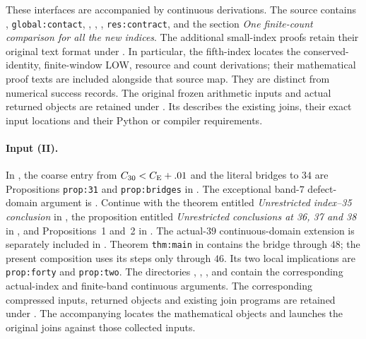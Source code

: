 These interfaces are accompanied by continuous derivations.
The source
contains , \texttt{global:contact},
,
,
, \texttt{res:contract},
and the section \emph{One finite-count comparison for all the new indices}.
The additional small-index proofs retain their original text format under
.
In particular, the fifth-index
locates the conserved-identity, finite-window LOW, resource and count
derivations; their mathematical proof texts are included alongside that
source map. They are distinct from numerical success records.
The original frozen arithmetic inputs and actual returned objects are
retained under .
Its  describes the existing joins,
their exact input locations and their Python or compiler requirements.

\paragraph{Input (II).}
In , the coarse entry from
$C_{30}<C_{\mathrm E}+.01$ and the literal bridges to $34$ are
Propositions \texttt{prop:31} and \texttt{prop:bridges} in
. The exceptional band-$7$ defect-domain
argument is .
Continue with the theorem entitled
\emph{Unrestricted index--35 conclusion} in
,
the proposition entitled \emph{Unrestricted conclusions at 36, 37 and 38}
in ,
and Propositions~1 and~2 in .
The actual-$39$ continuous-domain extension is separately included in
.
Theorem \texttt{thm:main} in  contains the
bridge through $48$; the present composition uses its steps only
through $46$. Its two local implications are
\texttt{prop:forty} and \texttt{prop:two}.
The directories , ,
, and  contain the corresponding
actual-index and finite-band continuous arguments.
The corresponding compressed inputs, returned objects and existing
join programs are retained under .
The accompanying  locates the mathematical
objects and launches the original joins against those collected inputs.

